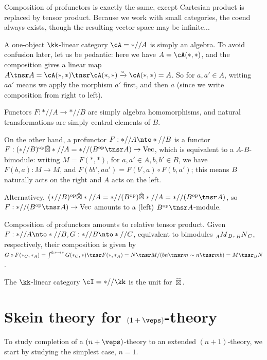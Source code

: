 \documentclass[12pt]{article}
\newcommand{\op}{{\text{op}}}
\newcommand{\hatbox}{{\hat{\boxtimes}}}
\DeclareMathOperator{\Vect}{Vec}
\begin{document}
Composition of profunctors is exactly the same,
except Cartesian product is replaced by tensor product.
Because we work with small categories,
the coend always exists, though the resulting vector space
may be infinite...


\begin{example}
A one-object $\kk$-linear category $\cA = *//A$
is simply an algebra.
To avoid confusion later, let us be pedantic:
here we have $A = \cA(*,*)$,
and the composition gives a linear map
$A \tnsr A = \cA(*,*) \tnsr \cA(*,*) \xrightarrow{\circ} \cA(*,*) = A$.
So for $a,a'\in A$,
writing $aa'$ means we apply the morphism $a'$ first,
and then $a$
(since we write composition from right to left).

Functors $F: *//A \to *//B$ are simply algebra homomorphisms,
and natural transformations are simply central elements of $B$.

On the other hand, a profunctor $F: *//A \nto *//B$
is a functor
$F: (*//B)^\op \hatbox *//A = *//(B^\op \tnsr A) \to \Vect$,
which is equivalent to a $A$-$B$-bimodule:
writing $M = F(*,*)$,
for $a,a' \in A, b,b' \in B$,
we have $F(b,a): M \to M$,
and $F(bb',aa') = F(b',a) \circ F(b,a')$;
this means $B$ naturally acts on the right
and $A$ acts on the left.

Alternativey,
$(*//B)^\op \hatbox *//A = *//(B^\op) \hatbox *//A = *//(B^\op \tnsr A)$,
so $F: *//(B^\op \tnsr A) \to \Vect$
amounts to a (left) $B^\op \tnsr A$-module.


Composition of profunctors amounts to relative tensor product.
Given $F: *//A \nto *//B, G: *//B \nto *//C$,
equivalent to bimodules $\prescript{}{A}M_B,
\prescript{}{B}N_C$, respectively,
their composition is given by
$G \circ F(*_C,*_A) = \int^{b:* \to *} G(*_C,*) \tnsr F(*,*_A)
= N \tnsr M / (bn \tnsr m \sim n \tnsr mb)
= M \tnsr_B N$.

\end{example}


\begin{example}
The $\kk$-linear category $\cI = *//\kk$
is the unit for $\hatbox$.
\end{example}


\section{Skein theory for $(1+\veps)$-theory}
\label{s:skeins}

To study completion of a $(n+\veps)$-theory
to an extended $(n+1)$-theory,
we start by studying the simplest case, $n = 1$.
\end{document}
